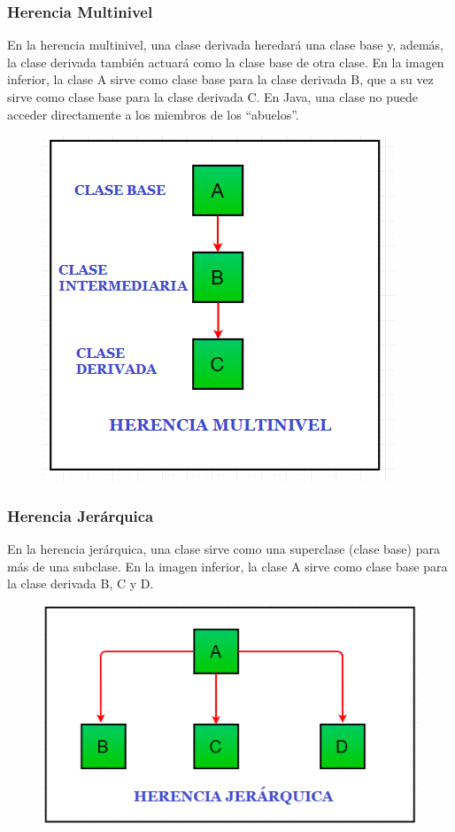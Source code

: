 \documentclass[12pt,a4paper]{report}
\begin{document}
{\subsubsection*{Herencia Multinivel}
En la herencia multinivel, una clase derivada heredará una clase base y, además, la clase derivada también actuará como la clase base de otra clase. En la imagen inferior, la clase A sirve como clase base para la clase derivada B, que a su vez sirve como clase base para la clase derivada C. En Java, una clase no puede acceder directamente a los miembros de los “abuelos”.
\begin{figure}[hbtp]
\centering
\includegraphics[scale=0.5]{herenciamultinivel.png}
\end{figure}

\subsubsection*{Herencia Jerárquica}
En la herencia jerárquica, una clase sirve como una superclase (clase base) para más de una subclase. En la imagen inferior, la clase A sirve como clase base para la clase derivada B, C y D.
\begin{figure}[hbtp]
\centering
\includegraphics[scale=0.5]{herenciajerarquica.png}
\end{figure}

}
\end{document}
